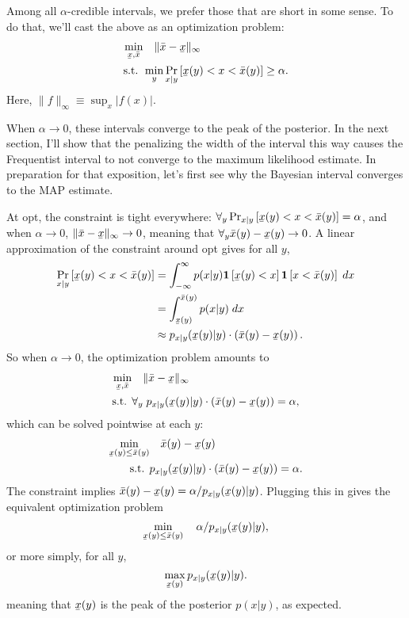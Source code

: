 \documentclass{article}
\newcommand{\xl}{\underaccent{\bar}{x}}
\newcommand{\xh}{\bar{x}}
\newcommand{\1}{\mathbf{1}}
\begin{document}
Among all $\alpha$-credible intervals, we prefer those that are short in some
sense. To do that, we'll cast the above as an optimization problem:
\begin{align}\label{eq:bayes-interval}
\min_{\xl, \xh} &\quad  \| \xh - \xl \|_\infty \\
\text{s.t. } & \min_y \Pr_{x|y}\left[\xl(y) < x < \xh(y)\right] \geq \alpha.
\end{align}
Here, $\|f\|_\infty \equiv \sup_x |f(x)|$.

When $\alpha\to 0$, these intervals converge to the peak of the posterior. In
the next section, I'll show that the penalizing the width of the interval this
way causes the Frequentist interval to not converge to the maximum likelihood
estimate. In preparation for that exposition, let's first see why the Bayesian
interval converges to the MAP estimate.

At opt, the constraint is tight everywhere: $\forall_y
\Pr_{x|y}\left[\xl(y) < x < \xh(y)\right] = \alpha$, and when $\alpha\to 0$,
$\| \xh - \xl \|_\infty \to 0$, meaning that $\forall_y \xh(y) - \xl(y) \to 0$.
A linear approximation of the constraint around opt gives for all $y$,
\begin{align}
        \Pr_{x|y}\left[\xl(y) < x < \xh(y)\right] &= \int_{-\infty}^\infty p(x|y) \1\left[ \xl(y) < x\right] \1\left[x < \xh(y)\right] \;dx\\
        &= \int_{\xl(y)}^{\xh(y)} p(x|y) \;dx\\
        &\approx p_{x|y}(\xl(y) | y) \cdot \left(\xh(y)-\xl(y)\right).
\end{align}
So when $\alpha\to 0$, the optimization problem amounts to
\begin{align}
\min_{\xl, \xh} &\quad  \| \xh - \xl \|_\infty \\
        \text{s.t. } & \forall_y\; p_{x|y}(\xl(y) | y) \cdot \left(\xh(y)-\xl(y)\right) =\alpha,
\end{align}
which can be solved pointwise at each $y$:
\begin{align}
        \min_{\xl(y)\leq \xh(y)} &\quad  \xh(y)-\xl(y) \\
        \text{s.t. } & p_{x|y}(\xl(y) | y) \cdot \left(\xh(y)-\xl(y)\right) =\alpha.
\end{align}
The constraint implies $\xh(y)-\xl(y) = \alpha / p_{x|y}(\xl(y) | y) $. Plugging this in gives the equivalent optimization problem
\[
        \min_{\xl(y)\leq \xh(y)} \quad  \alpha / p_{x|y}(\xl(y) | y),
\]
or more simply, for all $y$,
\[
        \max_{\xl(y)}  p_{x|y}(\xl(y) | y).
\]
meaning that $\xl(y)$ is the peak of the posterior $p(x|y)$, as expected.
\end{document}
